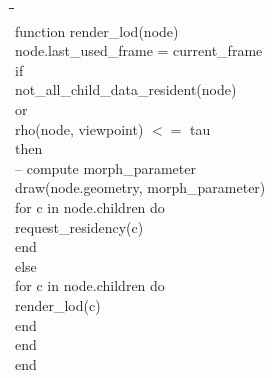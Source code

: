 \documentclass[12pt]{article}
\begin{document}
\begin{ttfamily}
\begin{tabbing}
\hspace{0.25in}\=\hspace{0.25in}\=\hspace{0.25in}\=\hspace{0.25in}\=\hspace{0.25in}\= \\
function render\_lod(node)                                                      \\
\>      node.last\_used\_frame = current\_frame                                 \\
\>      if                                                                      \\
\>\>            not\_all\_child\_data\_resident(node)                           \\
\>      or                                                                      \\
\>\>            rho(node, viewpoint) $<=$ tau                   \\
\>      then                                                                    \\
\>\>            -- compute morph\_parameter                                     \\
\>\>            draw(node.geometry, morph\_parameter)                           \\
\>\>            for c in node.children do                                       \\
\>\>\>                  request\_residency(c)                                   \\
\>\>            end                                                             \\
\>      else                                                                    \\
\>\>            for c in node.children do                                       \\
\>\>\>                  render\_lod(c)                                          \\
\>\>            end                                                             \\
\>      end                                                                     \\
end
\end{tabbing}
\end{ttfamily}
 
\end{document}
